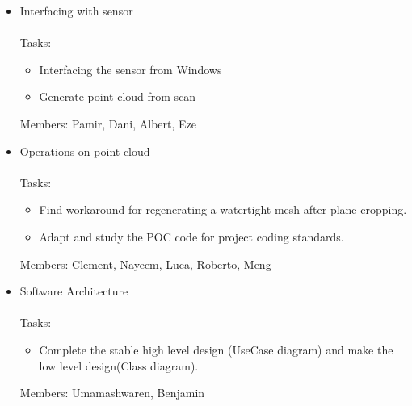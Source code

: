 \documentclass[11pt]{article} %
\begin{document}
	\begin{itemize}
	\item Interfacing with sensor~\\
	
	~\\Tasks:
	\begin{itemize}
	\item Interfacing the sensor from Windows
	\item  Generate point cloud from scan
	\end{itemize}
	Members: Pamir, Dani, Albert, Eze

	\item Operations on point cloud~\\
	~\\Tasks:
	\begin{itemize}
	\item Find workaround for regenerating a watertight mesh after plane cropping.
	\item Adapt and study the POC code for project coding standards.
	\end{itemize}
	Members: Clement, Nayeem, Luca, Roberto, Meng
	

	\item Software Architecture~\\
	~\\Tasks:
	\begin{itemize}
	\item Complete the stable high level design (UseCase diagram) and make the low level design(Class diagram). 
	\end{itemize}
	Members: Umamashwaren, Benjamin
	\end{itemize}	
\end{document}
